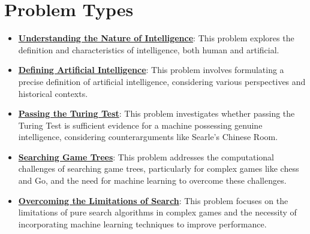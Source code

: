 \documentclass{article}%
\begin{document}
\section{Problem Types}%
\label{sec:ProblemTypes}%
\begin{itemize}[leftmargin=*]%
\item \href{\url{https://purdue.brightspace.com/d2l/common/assets/pdfjs-d2l-dist/1.0.14-legacy/web/viewer.html?file=\%252Fcontent\%252Fenforced\%252F1095467-wl.202510.CS.24300.001\%252F02L2-Intro.pdf\%253Fou\%253D1095467\&lang=en-us\&container=d2l-fileviewer-rendered-pdf\&fullscreen=d2l-fileviewer-rendered-pdf-dialog\&height=667}#page=3}{\textbf{Understanding the Nature of Intelligence}}: This problem explores the definition and characteristics of intelligence, both human and artificial.%
\item \href{\url{https://purdue.brightspace.com/d2l/common/assets/pdfjs-d2l-dist/1.0.14-legacy/web/viewer.html?file=\%252Fcontent\%252Fenforced\%252F1095467-wl.202510.CS.24300.001\%252F02L2-Intro.pdf\%253Fou\%253D1095467\&lang=en-us\&container=d2l-fileviewer-rendered-pdf\&fullscreen=d2l-fileviewer-rendered-pdf-dialog\&height=667}#page=5}{\textbf{Defining Artificial Intelligence}}: This problem involves formulating a precise definition of artificial intelligence, considering various perspectives and historical contexts.%
\item \href{\url{https://purdue.brightspace.com/d2l/common/assets/pdfjs-d2l-dist/1.0.14-legacy/web/viewer.html?file=\%252Fcontent\%252Fenforced\%252F1095467-wl.202510.CS.24300.001\%252F02L2-Intro.pdf\%253Fou\%253D1095467\&lang=en-us\&container=d2l-fileviewer-rendered-pdf\&fullscreen=d2l-fileviewer-rendered-pdf-dialog\&height=667}#page=6}{\textbf{Passing the Turing Test}}: This problem investigates whether passing the Turing Test is sufficient evidence for a machine possessing genuine intelligence, considering counterarguments like Searle's Chinese Room.%
\item \href{\url{https://purdue.brightspace.com/d2l/common/assets/pdfjs-d2l-dist/1.0.14-legacy/web/viewer.html?file=\%252Fcontent\%252Fenforced\%252F1095467-wl.202510.CS.24300.001\%252F02L2-Intro.pdf\%253Fou\%253D1095467\&lang=en-us\&container=d2l-fileviewer-rendered-pdf\&fullscreen=d2l-fileviewer-rendered-pdf-dialog\&height=667}#page=11}{\textbf{Searching Game Trees}}: This problem addresses the computational challenges of searching game trees, particularly for complex games like chess and Go, and the need for machine learning to overcome these challenges.%
\item \href{\url{https://purdue.brightspace.com/d2l/common/assets/pdfjs-d2l-dist/1.0.14-legacy/web/viewer.html?file=\%252Fcontent\%252Fenforced\%252F1095467-wl.202510.CS.24300.001\%252F02L2-Intro.pdf\%253Fou\%253D1095467\&lang=en-us\&container=d2l-fileviewer-rendered-pdf\&fullscreen=d2l-fileviewer-rendered-pdf-dialog\&height=667}#page=12}{\textbf{Overcoming the Limitations of Search}}: This problem focuses on the limitations of pure search algorithms in complex games and the necessity of incorporating machine learning techniques to improve performance.%

\end{itemize}
\end{document}
